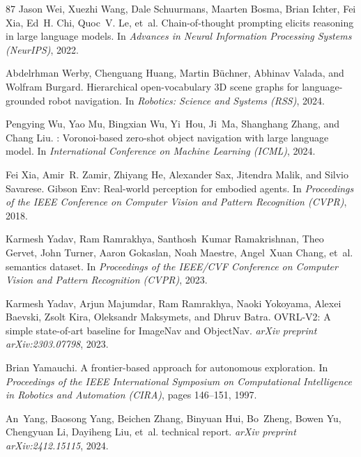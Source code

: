 \documentclass[10pt]{article}
\begin{document}
\begin{thebibliography}{87}
Jason Wei, Xuezhi Wang, Dale Schuurmans, Maarten Bosma, Brian Ichter, Fei Xia, Ed~H. Chi, Quoc~V. Le, et~al.
\newblock Chain-of-thought prompting elicits reasoning in large language models.
\newblock In \emph{Advances in Neural Information Processing Systems (NeurIPS)}, 2022.

Abdelrhman Werby, Chenguang Huang, Martin B{\"u}chner, Abhinav Valada, and Wolfram Burgard.
\newblock Hierarchical open-vocabulary 3D scene graphs for language-grounded robot navigation.
\newblock In \emph{Robotics: Science and Systems (RSS)}, 2024.

Pengying Wu, Yao Mu, Bingxian Wu, Yi~Hou, Ji~Ma, Shanghang Zhang, and Chang Liu.
: Voronoi-based zero-shot object navigation with large language model.
\newblock In \emph{International Conference on Machine Learning (ICML)}, 2024.

Fei Xia, Amir~R. Zamir, Zhiyang He, Alexander Sax, Jitendra Malik, and Silvio Savarese.
\newblock Gibson {Env}: Real-world perception for embodied agents.
\newblock In \emph{Proceedings of the IEEE Conference on Computer Vision and Pattern Recognition (CVPR)}, 2018.

Karmesh Yadav, Ram Ramrakhya, Santhosh~Kumar Ramakrishnan, Theo Gervet, John Turner, Aaron Gokaslan, Noah Maestre, Angel~Xuan Chang, et~al.
 semantics dataset.
\newblock In \emph{Proceedings of the IEEE/CVF Conference on Computer Vision and Pattern Recognition (CVPR)}, 2023.

Karmesh Yadav, Arjun Majumdar, Ram Ramrakhya, Naoki Yokoyama, Alexei Baevski, Zsolt Kira, Oleksandr Maksymets, and Dhruv Batra.
\newblock OVRL-V2: A simple state-of-art baseline for ImageNav and ObjectNav.
\newblock \emph{arXiv preprint arXiv:2303.07798}, 2023.

Brian Yamauchi.
\newblock A frontier-based approach for autonomous exploration.
\newblock In \emph{Proceedings of the IEEE International Symposium on Computational Intelligence in Robotics and Automation (CIRA)}, pages 146--151, 1997.

An~Yang, Baosong Yang, Beichen Zhang, Binyuan Hui, Bo~Zheng, Bowen Yu, Chengyuan Li, Dayiheng Liu, et~al.
 technical report.
\newblock \emph{arXiv preprint arXiv:2412.15115}, 2024.


\end{thebibliography}
\end{document}
